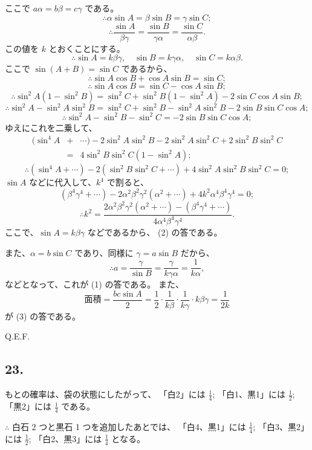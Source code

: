 ここで $a \alpha = b \beta = c \gamma$ である。
\[
\therefore
\alpha \sin A = \beta \sin B = \gamma \sin C;
\]
\[
\therefore
\frac{\sin A}{\beta \gamma} = \frac{\sin B}{\gamma \alpha}
  = \frac{\sin C}{\alpha \beta}.
\]
この値を $k$ とおくことにする。
\[
\therefore
\sin A = k \beta \gamma,
\quad \sin B = k \gamma \alpha,
\quad \sin C = k \alpha \beta.
\]
ここで $\sin (A + B) = \sin C$ であるから、
\[
\therefore
\sin A \cos B + \cos A \sin B = \sin C;
\]
\[
\therefore
\sin A \cos B  =  \sin C - \cos A \sin B;
\]
\[
\therefore
\sin^2 A (1 - \sin^2 B) = \sin^2 C + \sin^2 B (1 - \sin^2 A)
 - 2 \sin C \cos A \sin B;
\]
\[
\therefore
\sin^2 A  - \sin^2 A \sin^2 B
= \sin^2 C + \sin^2 B - \sin^2 A \sin^2 B
 - 2 \sin B \sin C \cos A;
\]
\[
\therefore
\sin^2 A - \sin^2 B - \sin^2 C
= -2 \sin B \sin C \cos A;
\]
ゆえにこれを二乗して、
\begin{eqnarray*}
(\sin^4 A &+& \cdots) - 2 \sin^2 A \sin^2 B - 2 \sin^2 A \sin^2 C
+ 2 \sin^2 B \sin^2 C\\
&=&
4 \sin^2 B \sin^2 C (1 - \sin^2 A);
\end{eqnarray*}
\[
\therefore
(\sin^4 A + \cdots) - 2 (\sin^2 B \sin^2 C + \cdots)
+ 4 \sin^2 A \sin^2 B \sin^2 C = 0;
\]
$\sin A$ などに代入して、$k^4$ で割ると、
\[
(\beta^4 \gamma^4 + \cdots) - 2 \alpha^2 \beta^2 \gamma^2 (\alpha^2 + \cdots)
+ 4 k^2 \alpha^4 \beta^4 \gamma^4 = 0;
\]
\[
\therefore
k^2 =
\frac{2 \alpha^2 \beta^2 \gamma^2 (\alpha^2 + \cdots) - (\beta^4 \gamma^4 + \cdots)}{4 \alpha^4 \beta^4 \gamma^4}.
\]
ここで、$\sin A = k \beta \gamma$ などであるから、
(2) の答である。

また、$\alpha = b \sin C$ であり、同様に $\gamma = a \sin B$ だから、
\[
\therefore
a = \frac{\gamma}{\sin B} = \frac{\gamma}{k \gamma \alpha} = \frac{1}{k\alpha},
\]
などとなって、これが (1) の答である。
また、
\[
\mbox{面積}
= \frac{bc \sin A}{2} = \frac{1}{2} \cdot \frac{1}{k\beta} \cdot \frac{1}{k\gamma} \cdot k \beta \gamma = \frac{1}{2k}
\]
が (3) の答である。

Q.E.F.

\subsection*{23.}

もとの確率は、袋の状態にしたがって、
「白2」には $\frac{1}{4}$;
「白1、黒1」には  $\frac{1}{2}$;
「黒2」には $\frac{1}{4}$
である。

$\therefore$ 白石 2 つと黒石 1 つを追加したあとでは、
「白4、黒1」には $\frac{1}{4}$;
「白3、黒2」には  $\frac{1}{2}$;
「白2、黒3」には $\frac{1}{4}$
となる。


